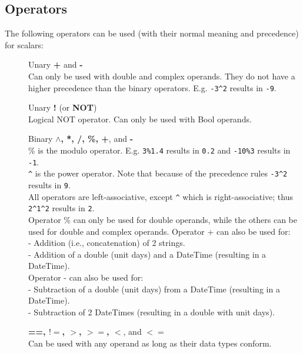 \subsection{\label{TAQL:OPERATORS}Operators}
The following operators can be used (with their normal meaning and
precedence) for scalars:
\begin{description}
  \item[] Unary \textbf{+} and \textbf{-}
       \\Can only be used with double and complex operands.
       They do not have a higher precedence than the binary operators.
       E.g. \texttt{-3}\verb+^+\texttt{2} results in \texttt{-9}.
  \item[] Unary \textbf{!} (or \textbf{NOT})
       \\Logical NOT operator.
       Can only be used with Bool operands.
  \item[] Binary \textbf{$\wedge$, *, /, \%, +}, and \textbf{-}
       \\\% is the modulo operator.
       E.g. \texttt{3\%1.4} results in \texttt{0.2} and
       \texttt{-10\%3} results in \texttt{-1}.
       \\\verb+^+ is the power operator.
       Note that because of the precedence rules
       \texttt{-3}\verb+^+\texttt{2} results in \texttt{9}.
       \\All operators are left-associative, except \verb+^+ which is
       right-associative; thus \texttt{2}\verb+^+\texttt{1}\verb+^+\texttt{2} results in \texttt{2}.
       \\Operator \% can only be used for double operands, while the others
       can be used for double and complex operands.
       Operator + can also be used for:
       \\- Addition (i.e., concatenation) of 2 strings.
       \\- Addition of a double (unit days) and a DateTime
       (resulting in a DateTime).
       \\Operator - can also be used for:
       \\- Subtraction of a double (unit days) from a DateTime
       (resulting in a DateTime).
       \\- Subtraction of 2 DateTimes (resulting in a double with unit days).
  \item[] \textbf{==, $!=$, $>$, $>=$, $<$}, and \textbf{$<=$}
       \\Can be used with any operand as long as their data types conform.

\end{description}
